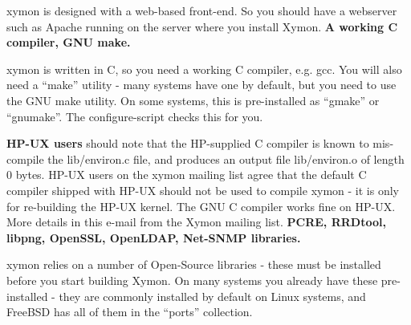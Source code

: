  xymon is designed with a web-based front-end. So you should have a webserver such as Apache running on the server where you install Xymon.
\textbf{A working C compiler, GNU make.}


 xymon is written in C, so you need a working C compiler, e.g. gcc. You will also need a ``make'' utility - many systems have one by default, but you need to use the GNU make utility. On some systems, this is pre-installed as ``gmake'' or ``gnumake''. The configure-script checks this for you.


 \textbf{HP-UX users}
 should note that the HP-supplied C compiler is known to mis-compile the lib/environ.c file, and produces an output file lib/environ.o of length 0 bytes. HP-UX users on the xymon mailing list agree that the default C compiler shipped with HP-UX should not be used to compile xymon - it is only for re-building the HP-UX kernel. The GNU C compiler works fine on HP-UX. More details in this e-mail from the Xymon mailing list.
\textbf{PCRE, RRDtool, libpng, OpenSSL, OpenLDAP, Net-SNMP libraries.}


 xymon relies on a number of Open-Source libraries - these must be installed before you start building Xymon. On many systems you already have these pre-installed - they are commonly installed by default on Linux systems, and FreeBSD has all of them in the ``ports'' collection.


